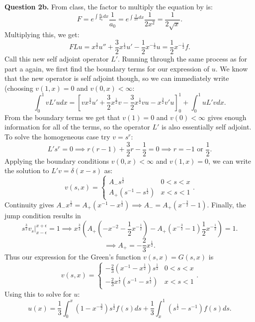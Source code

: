 \documentclass[letterpaper, reqno,11pt]{article}
\begin{document}
{\medskip\noindent\bf Question 2b.} From class, the factor to multiply the equation by is:
\[
F=e^{\int \frac{a_1}{a_0}dx}\frac{1}{a_0}=e^{\int\frac{3}{2x}dx}\frac{1}{2x^2}=\frac{1}{2\sqrt{x}}
.\]
Multiplying this, we get:
\[
FLu=x^{\frac{3}{2}}u''+\frac{3}{2}x^{\frac{1}{2}}u'-\frac{1}{2}x^{-\frac{1}{2}}u=\frac{1}{2}x^{-\frac{1}{2}}f
.\]
Call this new self adjoint operator $L'$. Running through the same process as for part a again, we first find the boundary terms for our expression of $u$. We know that the new operator is self adjoint though, so we can immediately write (choosing $v(1,x)=0$ and $v(0,x)<\infty$:
\[
    \int_0^{1}vL'udx=\left[vx^{\frac{3}{2}}u'+\frac{3}{2}x^{\frac{1}{2}}v-\frac{3}{2}x^{\frac{1}{2}}vu-x^{\frac{3}{2}}v'u\right]_0^{1}+\int_0^{1}uL'vdx
.\]
From the boundary terms we get that $v(1)=0$ and $v(0)<\infty$ gives enough information for all of the terms, so the operator $L'$ is also essentially self adjoint. To solve the homogeneous case try $v=s^{r}$:
\[
L's^{r}=0\implies r(r-1)+\frac{3}{2}r-\frac{1}{2}=0\implies r=-1\text{ or }\frac{1}{2}
.\]
Applying the boundary conditions $v(0,x)<\infty$ and $v(1,x)=0$, we can write the solution to $L'v=\delta(x-s)$ as:
\[
v(s,x)=\begin{cases}
    A_-s^{\frac{1}{2}}& 0<s<x\\
    A_+\left( s^{-1}-s^{\frac{1}{2}} \right) &x<s<1
\end{cases}
.\]
Continuity gives $A_-x^{\frac{1}{2}}=A_+\left(x^{-1}-x^{\frac{1}{2}}\right)\implies A_-=A_+\left( x^{-\frac{3}{2}}-1 \right) $. Finally, the jump condition results in
\[
    s^{\frac{3}{2}}v_s\big|_{x-\epsilon}^{x+\epsilon}=1\implies x^{\frac{3}{2}}\left( A_+\left(-x^{-2}-\frac{1}{2}x^{-\frac{1}{2}} \right) -A_+\left( x^{-\frac{3}{2}}-1 \right)\frac{1}{2} x^{-\frac{1}{2}} \right)=1
.\]
\[
\implies A_+=-\frac{2}{3}x^{\frac{1}{2}}
.\]
Thus our expression for the Green's function $v(s,x)=G(s,x)$ is
\[
v(s,x)=\begin{cases}
    -\frac{2}{3}\left(x^{-1}-x^{\frac{1}{2}}\right)s^{\frac{1}{2}}&0<s<x\\
    -\frac{2}{3}x^{\frac{1}{2}}\left( s^{-1}-s^{\frac{1}{2}} \right)&x<s<1
\end{cases}
.\]
Using this to solve for $u$:
\[
u(x)=\frac{1}{3}\int_0^{x}\left( 1-x^{-\frac{3}{2}} \right) s^{\frac{1}{2}}f(s)ds+\frac{1}{3}\int_x^{1}\left( s^{\frac{1}{2}}-s^{-1} \right)f(s)ds
.\]
\end{document}
